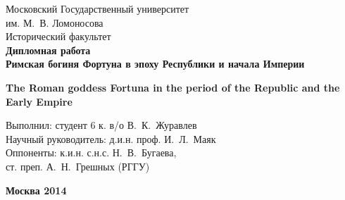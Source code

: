 \begin{titlepage}
\newpage

\begin{center}
Московский Государственный университет\\
им. М.~В. Ломоносова\\
Исторический факультет\\
\vspace{2cm}
\textbf{\large{Дипломная работа}}\\
\vspace{1cm}
\textbf{\Large{Римская богиня Фортуна в эпоху Республики и начала Империи\\}}

\vspace{1cm}

\textbf{\Large{The Roman goddess Fortuna in the period of the Republic and the Early Empire}}

\vspace{3cm}

\begin{flushright}

Выполнил: студент 6 к. в/о В.~К.~Журавлев\\

Научный руководитель: д.и.н. проф. И.~Л.~Маяк\\

Оппоненты: к.и.н. с.н.с. Н.~В.~Бугаева,\\ст. преп. А.~Н.~Грешных (РГГУ)

\end{flushright}

\end{center}

\vspace{\fill}

\begin{center}
\textbf{Москва 2014}
\end{center}

\end{titlepage}